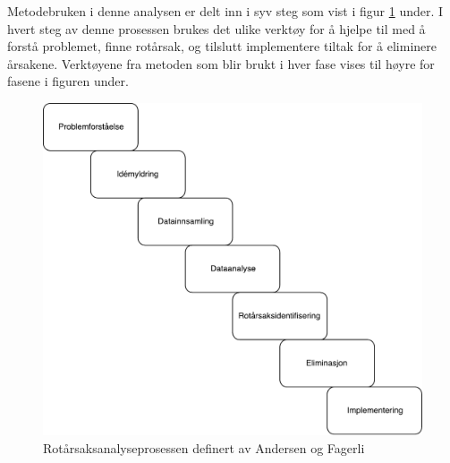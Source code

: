 Metodebruken i denne analysen er delt inn i syv steg som vist i figur \ref{fig:prosess} under. I hvert steg av denne prosessen brukes det ulike verktøy for å hjelpe til med å forstå problemet, finne rotårsak, og tilslutt implementere tiltak for å eliminere årsakene. Verktøyene fra metoden som blir brukt i hver fase vises til høyre for fasene i figuren under. 
\begin{figure}[H]
    \centering
    \includegraphics[scale=0.6]{case_1/bilder/prosess.pdf}
    \caption[Rotårsaksanalyseprosessen]{Rotårsaksanalyseprosessen definert av Andersen og Fagerli}
    \label{fig:prosess}
\end{figure}